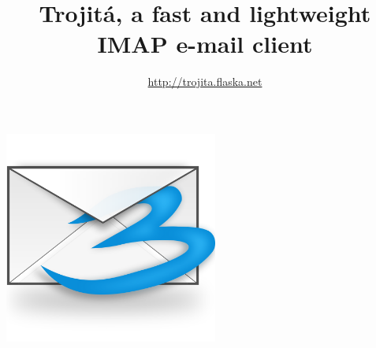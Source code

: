 \documentclass{beamer}
\begin{document}
\title{Trojitá, a fast and lightweight IMAP e-mail client}
\author{\url{http://trojita.flaska.net}}
\date{}

\begin{frame}
\begin{center}
\includegraphics[width=7cm,clip, trim=0mm 20mm 0mm 30mm]{trojita-from-svg.png}
\maketitle
\end{center}
\end{frame}
\end{document}
